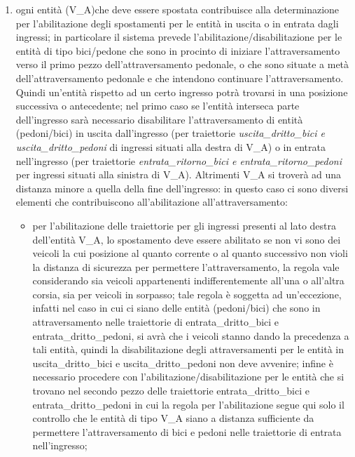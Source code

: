 \begin{enumerate}
\begin{enumerate}
\item ogni entità (V\_A)che deve essere spostata contribuisce alla determinazione per l'abilitazione degli spostamenti per le entità in uscita o in entrata dagli ingressi; in particolare il sistema prevede l'abilitazione/disabilitazione per le entità di tipo bici/pedone che sono in procinto di iniziare l'attraversamento verso il primo pezzo dell'attraversamento pedonale, o che sono situate a metà dell'attraversamento pedonale e che intendono continuare l'attraversamento. Quindi un'entità rispetto ad un certo ingresso potrà trovarsi in una posizione successiva o antecedente; nel primo caso se l'entità interseca parte dell'ingresso sarà necessario disabilitare l'attraversamento di entità (pedoni/bici) in uscita dall'ingresso (per traiettorie \textit{usci\-ta\_drit\-to\_bi\-ci e usci\-ta\_drit\-to\_pe\-do\-ni} di ingressi situati alla destra di V\_A) o in entrata nell'ingresso (per traiettorie \textit{en\-tra\-ta\_ri\-tor\-no\_bi\-ci e en\-tra\-ta\_ri\-tor\-no\_pe\-do\-ni} per ingressi situati alla sinistra di V\_A). Altrimenti V\_A si troverà ad una distanza minore a quella della fine dell'ingresso: in questo caso ci sono diversi elementi che contribuiscono all'abilitazione all'attraversamento:
\begin{itemize}
\item per l'abilitazione delle traiettorie per gli ingressi presenti al lato destra dell'entità V\_A, lo spostamento deve essere abilitato se non vi sono dei veicoli la cui posizione al quanto corrente o al quanto successivo non violi la distanza di sicurezza per permettere l'attraversamento, la regola vale considerando sia veicoli appartenenti indifferentemente all'una o all'altra corsia, sia per veicoli in sorpasso; tale regola è soggetta ad un'eccezione, infatti nel caso in cui ci siano delle entità (pedoni/bici) che sono in attraversamento nelle traiettorie di en\-tra\-ta\_drit\-to\_bi\-ci e en\-tra\-ta\_drit\-to\_pe\-do\-ni, si avrà che i veicoli stanno dando la precedenza a tali entità, quindi la disabilitazione degli attraversamenti per le entità in usci\-ta\_drit\-to\_bi\-ci e usci\-ta\_drit\-to\_pe\-do\-ni non deve avvenire; infine è necessario procedere con l'abilitazione/disabilitazione per le entità che si trovano nel secondo pezzo delle traiettorie en\-tra\-ta\_drit\-to\_bi\-ci e en\-tra\-ta\_drit\-to\_pe\-do\-ni in cui la regola per l'abilitazione segue qui solo il controllo che le entità di tipo V\_A siano a distanza sufficiente da permettere l'attraversamento di bici e pedoni nelle traiettorie di entrata nell'ingresso;

\end{itemize}
\end{enumerate}
\end{enumerate}

